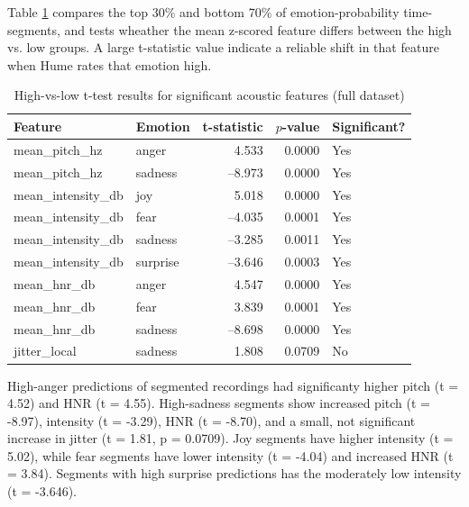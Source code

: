 Table \ref{tab:ttest_full_features} compares the top 30\% and bottom 70\% of emotion-probability time-segments, and tests wheather the mean z-scored feature differs between the high vs. low groups. 
A large t-statistic value indicate a reliable shift in that feature when Hume rates that emotion high. 
\begin{table}[H]
    \centering
    \caption{High-vs-low t-test results for significant acoustic features (full dataset)}
    \begin{tabular}{l l r r l}
      \toprule
      \textbf{Feature} & \textbf{Emotion} & \textbf{t-statistic} & \textbf{\(p\)-value} & \textbf{Significant?} \\
      \midrule
      mean\_pitch\_hz       & anger     &  4.533 & 0.0000 & Yes \\
      mean\_pitch\_hz       & sadness   & –8.973 & 0.0000 & Yes \\
      mean\_intensity\_db   & joy       &  5.018 & 0.0000 & Yes \\
      mean\_intensity\_db   & fear      & –4.035 & 0.0001 & Yes \\
      mean\_intensity\_db   & sadness   & –3.285 & 0.0011 & Yes \\
      mean\_intensity\_db   & surprise  & –3.646 & 0.0003 & Yes \\
      mean\_hnr\_db         & anger     &  4.547 & 0.0000 & Yes \\
      mean\_hnr\_db         & fear      &  3.839 & 0.0001 & Yes \\
      mean\_hnr\_db         & sadness   & –8.698 & 0.0000 & Yes \\
      jitter\_local         & sadness   &  1.808 & 0.0709 & No  \\
      \bottomrule
    \end{tabular}
    \label{tab:ttest_full_features}
  \end{table}
  
  High-anger predictions of segmented recordings had significanty higher pitch (t = 4.52) and HNR (t = 4.55). 
  High-sadness segments show increased pitch (t = -8.97), intensity (t = -3.29), HNR (t = -8.70), and a small, not significant increase in jitter (t = 1.81, p = 0.0709).
  Joy segments have higher intensity (t = 5.02), while fear segments have lower intensity (t = -4.04) and increased HNR (t = 3.84). 
  Segments with high surprise predictions has the moderately low intensity (t = -3.646). 
  
